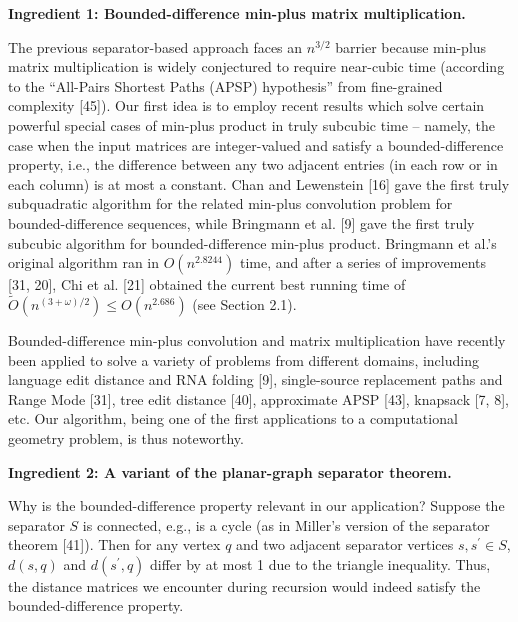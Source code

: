 \par\medskip\noindent\textbf{Ingredient 1: Bounded-difference min-plus matrix multiplication.}\par
The previous separator-based approach faces an $n^{3/2}$ barrier because min-plus matrix multiplication is widely conjectured to require near-cubic time (according to the “All-Pairs Shortest Paths (APSP) hypothesis” from fine-grained complexity [45]). Our first idea is to employ recent results which solve certain powerful special cases of min-plus product in truly subcubic time – namely, the case when the input matrices are integer-valued and satisfy a bounded-difference property, i.e., the difference between any two adjacent entries (in each row or in each column) is at most a constant. Chan and Lewenstein [16] gave the first truly subquadratic algorithm for the related min-plus convolution problem for bounded-difference sequences, while Bringmann et al. [9] gave the first truly subcubic algorithm for bounded-difference min-plus product. Bringmann et al.’s original algorithm ran in $O(n^{2.8244})$ time, and after a series of improvements [31, 20], Chi et al. [21] obtained the current best running time of $\widetilde{O}(n^{(3+\omega)/2})\leq O(n^{2.686})$ (see Section 2.1).
\par
\par
Bounded-difference min-plus convolution and matrix multiplication have recently been applied to solve a variety of problems from different domains, including language edit distance and RNA folding [9], single-source replacement paths and Range Mode [31], tree edit distance [40], approximate APSP [43], knapsack [7, 8], etc. Our algorithm, being one of the first applications to a computational geometry problem, is thus noteworthy.
\par
\par
\par\medskip\noindent\textbf{Ingredient 2: A variant of the planar-graph separator theorem.}\par
Why is the bounded-difference property relevant in our application? Suppose the separator $S$ is connected, e.g., is a cycle (as in Miller’s version of the separator theorem [41]). Then for any vertex $q$ and two adjacent separator vertices $s,s^{\prime}\in S$, $d(s,q)$ and $d(s^{\prime},q)$ differ by at most 1 due to the triangle inequality. Thus, the distance matrices we encounter during recursion would indeed satisfy the bounded-difference property.
